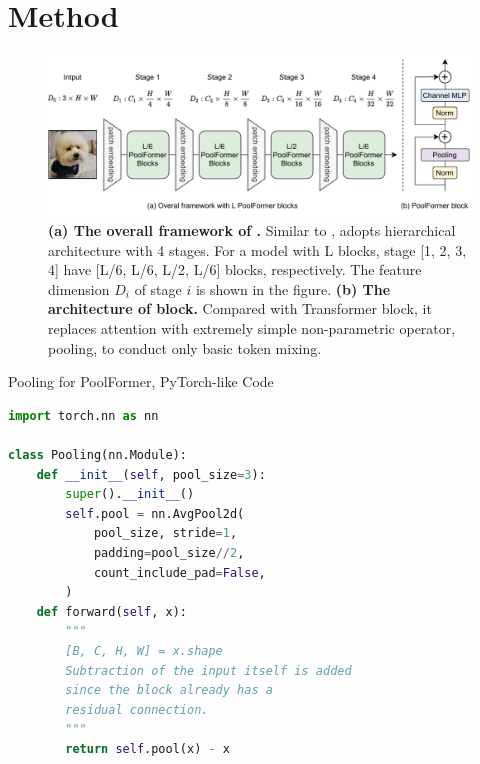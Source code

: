 \section{Method}
\begin{figure}[t]
  \centering
   \includegraphics[width=0.85\linewidth]{figures/PoolFormer_overall_architecture.pdf}
   \vspace{-4mm}
   \caption{\textbf{(a) The overall framework of \modelname{}.} Similar to \cite{resnet, pvt, swin}, \modelname{} adopts hierarchical architecture with 4 stages. For a model with L \modelname{} blocks, stage [1, 2, 3, 4] have [L/6, L/6, L/2, L/6] blocks, respectively. The feature dimension $D_i$ of stage $i$ is shown in the figure. \textbf{(b) The architecture of \modelname{} block.} Compared with Transformer block, it replaces attention with extremely simple non-parametric operator, pooling, to conduct only basic token mixing.}
   \label{fig:overall_architecture}
\end{figure}


\begin{algorithm}[t]
\caption{Pooling for PoolFormer, PyTorch-like Code}
\label{alg:code}
\begin{lstlisting}[language=python]
import torch.nn as nn

class Pooling(nn.Module):
    def __init__(self, pool_size=3):
        super().__init__()
        self.pool = nn.AvgPool2d(
            pool_size, stride=1, 
            padding=pool_size//2, 
            count_include_pad=False,
        )
    def forward(self, x):
        """
        [B, C, H, W] = x.shape
        Subtraction of the input itself is added 
        since the block already has a 
        residual connection.
        """
        return self.pool(x) - x
\end{lstlisting}
\end{algorithm}

